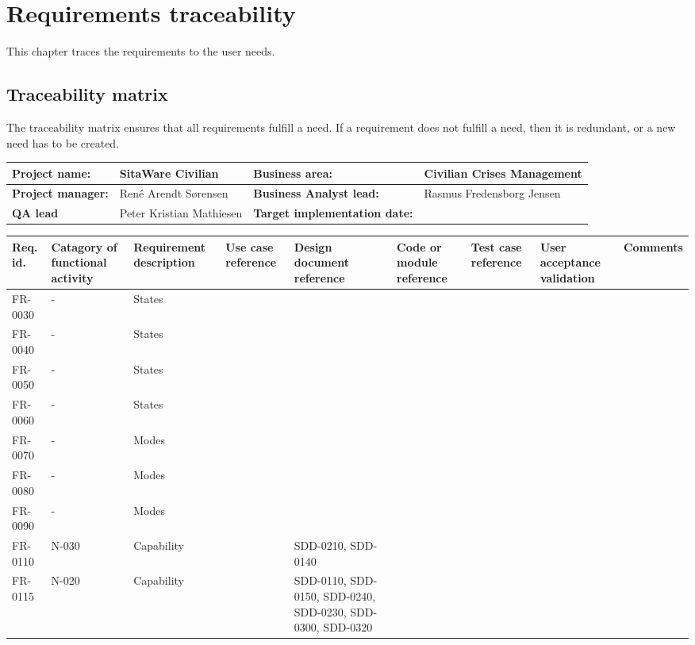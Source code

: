 \chapter{Requirements traceability}
This chapter traces the requirements to the user needs.

\section{Traceability matrix}
The traceability matrix ensures that all requirements fulfill a need. If a requirement does not fulfill a need, then it is redundant, or a new need has to be created.


\begin{sidewaystable}
\begin{table}[H]
\begin{tabular}{|l|l|l|l|}
\hline
 \textbf{Project name:} & SitaWare Civilian & \textbf{Business area:}  & Civilian Crises Management\\ \hline
 \textbf{Project manager:} & René Arendt Sørensen & \textbf{Business Analyst lead:} & Rasmus Fredensborg  Jensen\\ \hline
 \textbf{QA lead} & Peter Kristian Mathiesen & \textbf{Target implementation date:}  & \\ \hline
\end{tabular}	
\begin{tabular}{|p{2cm}|p{2cm}|p{3cm}|p{2cm}|p{2cm}|p{2cm}|p{2cm}|p{2cm}|p{2cm}|}
\hline
 Req. id. & Catagory of functional activity & Requirement description  & Use case reference & Design document reference & Code or module reference & Test case reference & User acceptance validation & Comments\\ \hline
 FR-0030 & - & States & &  & & & &\\ \hline 
FR-0040 & - & States & & & & & &\\ \hline  
FR-0050 & - & States & & & & & &\\ \hline  
FR-0060 & - & States & & & & & &\\ \hline  
FR-0070 & - & Modes & & & & & &\\ \hline  
FR-0080 & - & Modes & & & & & &\\ \hline 
FR-0090 & - & Modes & & & & & &\\ \hline 
 FR-0110 & N-030 & Capability & &SDD-0210, SDD-0140 & & & &\\ \hline
 FR-0115 & N-020 & Capability & &SDD-0110, SDD-0150, SDD-0240, SDD-0230, SDD-0300, SDD-0320& & & &\\ \hline

\end{tabular}
\end{table}
\end{sidewaystable}
